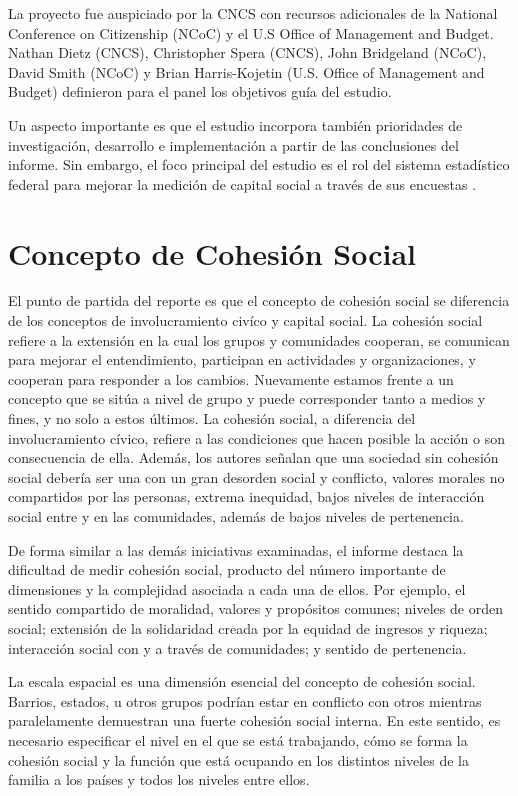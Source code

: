 \documentclass[
  12pt,
]{book}
\begin{document}
La proyecto fue auspiciado por la CNCS con recursos adicionales de la National Conference on Citizenship (NCoC) y el U.S Office of Management and Budget. Nathan Dietz (CNCS), Christopher Spera (CNCS), John Bridgeland (NCoC), David Smith (NCoC) y Brian Harris-Kojetin (U.S. Office of Management and Budget) definieron para el panel los objetivos guía del estudio.

Un aspecto importante es que el estudio incorpora también prioridades de investigación, desarrollo e implementación a partir de las conclusiones del informe. Sin embargo, el foco principal del estudio es el rol del sistema estadístico federal para mejorar la medición de capital social a través de sus encuestas \citep{prewitt_Civic_2014}.

\hypertarget{concepto-de-cohesiuxf3n-social}{%
\section{Concepto de Cohesión Social}\label{concepto-de-cohesiuxf3n-social}}

El punto de partida del reporte es que el concepto de cohesión social se diferencia de los conceptos de involucramiento civíco y capital social. La cohesión social refiere a la extensión en la cual los grupos y comunidades cooperan, se comunican para mejorar el entendimiento, participan en actividades y organizaciones, y cooperan para responder a los cambios. Nuevamente estamos frente a un concepto que se sitúa a nivel de grupo y puede corresponder tanto a medios y fines, y no solo a estos últimos. La cohesión social, a diferencia del involucramiento cívico, refiere a las condiciones que hacen posible la acción o son consecuencia de ella. Además, los autores señalan que una sociedad sin cohesión social debería ser una con un gran desorden social y conflicto, valores morales no compartidos por las personas, extrema inequidad, bajos niveles de interacción social entre y en las comunidades, además de bajos niveles de pertenencia.

De forma similar a las demás iniciativas examinadas, el informe destaca la dificultad de medir cohesión social, producto del número importante de dimensiones y la complejidad asociada a cada una de ellos. Por ejemplo, el sentido compartido de moralidad, valores y propósitos comunes; niveles de orden social; extensión de la solidaridad creada por la equidad de ingresos y riqueza; interacción social con y a través de comunidades; y sentido de pertenencia.

La escala espacial es una dimensión esencial del concepto de cohesión social. Barrios, estados, u otros grupos podrían estar en conflicto con otros mientras paralelamente demuestran una fuerte cohesión social interna. En este sentido, es necesario especificar el nivel en el que se está trabajando, cómo se forma la cohesión social y la función que está ocupando en los distintos niveles de la familia a los países y todos los niveles entre ellos.
\end{document}
